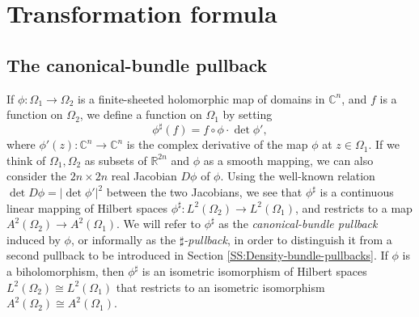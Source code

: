 \documentclass[letterpaper,11pt,reqno]{amsart}
\theoremstyle{plain}
\theoremstyle{definition}
\theoremstyle{remark}
\theoremstyle{remark}
\numberwithin{equation}{section}
\newcommand{\abs}[1]{\left\vert#1\right\vert}
\newcommand{\cx}{{\mathbb C}}
\newcommand{\rl}{\mathbb R}
\begin{document}
\section{Transformation formula}\label{sec-monomialtransformation}

\subsection{The canonical-bundle pullback} \label{sec-sharppullback}
If $\phi:\Omega_1\to \Omega_2$ is a  finite-sheeted holomorphic map of domains in $\cx^n$, and $f$ is a function on $\Omega_2$, we define a function on $\Omega_1$ by setting 
\begin{equation}\label{eq-sharp}
\phi^\sharp(f)= f\circ \phi\cdot \det \phi',
\end{equation}
where $\phi'(z):\cx^n\to \cx^n$ is the complex derivative of the map $\phi$ at $z\in \Omega_1$.
If we think of $\Omega_1, \Omega_2$ as subsets of $\rl^{2n}$ and $\phi$ as a smooth mapping, we can also consider the $2n\times 2n$ real Jacobian $D\phi$ of $\phi$.
Using the well-known relation $\det D\phi =\abs{\det\phi'}^2$ between the two  Jacobians, we see that $\phi^\sharp$ is a continuous linear mapping of Hilbert spaces $\phi^\sharp: L^2(\Omega_2)\to L^2(\Omega_1)$, and restricts to a map  $A^2(\Omega_2) \to A^2(\Omega_1)$. 
We will refer to $\phi^\sharp$ as the \emph{canonical-bundle pullback} induced by $\phi$, or informally as the \emph{$\sharp$-pullback}, in order to distinguish it from a second pullback to be introduced in Section \ref{SS:Density-bundle-pullbacks}.  
If $\phi$ is a biholomorphism, then $\phi^\sharp$ is an isometric isomorphism of Hilbert spaces $L^2(\Omega_2)\cong L^2(\Omega_1)$ that restricts to an isometric isomorphism $A^2(\Omega_2) \cong A^2(\Omega_1)$. 
\end{document}
